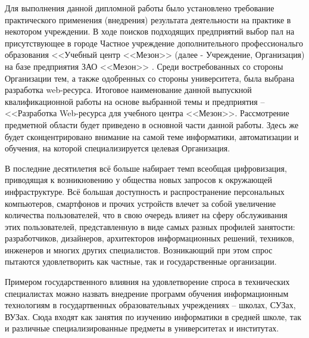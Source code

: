 


Для выполнения данной дипломной работы было установлено требование практического применения (внедрения) результата деятельности на практике в некотором учреждении.
В ходе поисков подходящих предприятий выбор пал на присутствующее в городе Частное учреждение дополнительного профессиональго образования <<Учебный центр <<Мезон>> \cite{meson-uc} (далее - Учреждение, Организация) на базе предприятия ЗАО <<Мезон>> \cite{meson}.
Среди востребованных со стороны Организации тем, а также одобренных со стороны университета, была выбрана разработка web-ресурса.
Итоговое наименование данной выпускной квалификационной работы на основе выбранной темы и предприятия -- <<Разработка Web-ресурса для учебного центра <<Мезон>>.
Рассмотрение предметной области будет приведено в основной части данной работы.
Здесь же будет сконцентрировано внимание на самой теме информатики, автоматизации и обучения, на которой специализируется целевая Организация.

В последние десятилетия всё больше набирает темп всеобщая цифровизация, приводящая к возникновению у общества новых запросов к окружающей инфраструктуре.
Всё большая доступность и распространение персональных компьютеров, смартфонов и прочих устройств влечет за собой увеличение количества пользователей, что в свою очередь влияет на сферу обслуживания этих пользователей, представленную в виде самых разных профилей занятости: разработчиков, дизайнеров, архитекторов информационных решений, техников, инженеров и многих других специалистов.
Возникающий при этом спрос пытаются удовлетворить как частные, так и государственные организации.

Примером государственного влияния на удовлетворение спроса в технических специалистах можно назвать внедрение программ обучения информационным технологиям в государтвенных образовательных учреждениях -- школах, СУЗах, ВУЗах.
Сюда входят как занятия по изучению информатики в средней школе, так и различные специализированные предметы в университетах и институтах.

